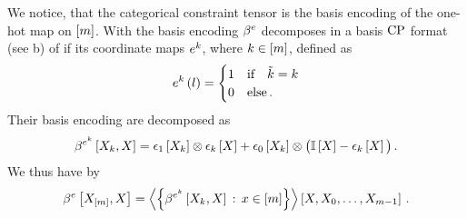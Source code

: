 We notice, that the categorical constraint tensor is the basis encoding of the one-hot map on $[m]$.
With  the basis encoding $\beta^{e}$ decomposes in a basis $\mathrm{CP}$ format (see b) of if its coordinate maps $e^{k}$, where $k\in[m]$, defined as
\begin{align*}
    e^{k}\left(l\right)
    = \begin{cases}
          1 & \text{if}\quad \tilde{k}=k \\
          0 & \text{else} \, .
      \end{cases}
\end{align*}
%
Their basis encoding are decomposed as
\begin{align}
    \beta^{e^{k}}\left[X_{k},X\right]
    = \epsilon_{1}\left[X_{k}\right] \otimes \epsilon_{k}\left[X\right]
    + \epsilon_{0}\left[X_{k}\right] \otimes \big(\mathbb{I}\left[X\right]- \epsilon_{k}\left[X\right]\big) \, .
\end{align}
We thus have by 
\begin{align*}
    \beta^{e}\left[X_{[m]},X\right]
    = \left\langle \left\{\beta^{e^{k}}\left[X_{k},X\right] \,:\, x\in[m]\right\}\right\rangle \left[ X, X_{0}, \ldots, X_{m-1} \right] \, .
\end{align*}


